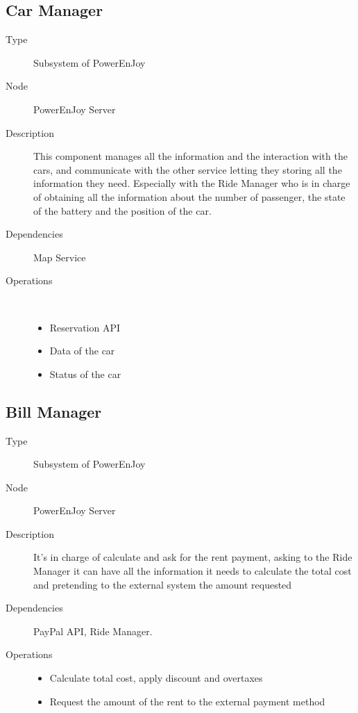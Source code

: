 \subsection{Car Manager}
\begin{description}
	\item[Type] Subsystem of PowerEnJoy
	\item[Node] PowerEnJoy Server
	\item[Description] This component manages all the information and the interaction with the cars, and communicate with the other service letting they storing all the information they need. Especially  with the Ride Manager who is in charge of obtaining all the information about the number of passenger, the state of the battery and the position of the car.
	\item[Dependencies] Map Service
	\item[Operations] \ \\
		\begin{itemize}
			\item Reservation API
			\item Data of the car
			\item Status of the car   
	\end{itemize}
\end{description}

\subsection{Bill Manager}
\begin{description}
	\item[Type] Subsystem of PowerEnJoy
	\item[Node] PowerEnJoy Server
	\item[Description] It's in charge of calculate and ask for the rent payment, asking to the Ride Manager it can have all the information it needs to calculate the total cost and pretending to the external system the amount requested
	\item[Dependencies] PayPal API, Ride Manager.
	\item[Operations] 
		\begin{itemize}
			\item Calculate total cost, apply discount and overtaxes 
			\item Request the amount of the rent to the external payment method 
		\end{itemize}
\end{description}

